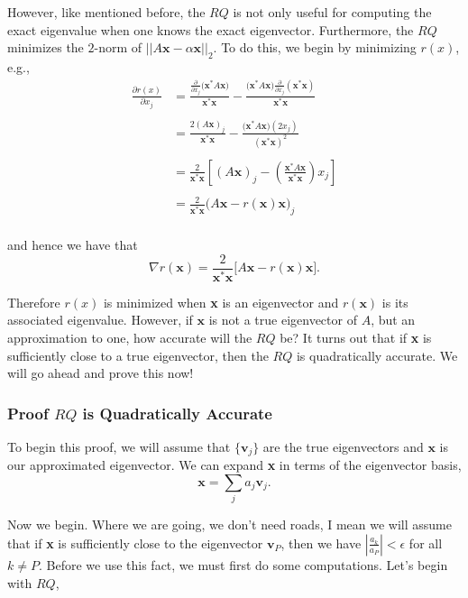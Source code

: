 \documentclass[paper=a4, fontsize=11pt]{scrartcl} %
\numberwithin{equation}{section} %
\numberwithin{figure}{section} %
\numberwithin{table}{section} %
\begin{document}
However, like mentioned before, the $RQ$ is not only useful for computing the exact eigenvalue when one knows the exact eigenvector. Furthermore, the $RQ$ minimizes the $2$-norm of $||A\textbf{x}-\alpha\textbf{x}||_2.$ To do this, we begin by minimizing $r(x)$, e.g.,
\begin{align*}
\frac{ \partial r(x) }{ \partial x_j } &= \frac{  \frac{ \partial}{ \partial x_j} \big( \textbf{x}^* A\textbf{x} \big) }{  \textbf{x}^*\textbf{x}  } - \frac{ \big(\textbf{x}^*A\textbf{x}  \big) \frac{\partial}{\partial x_j }  (\textbf{x}^*\textbf{x} )    }{  \textbf{x}^* \textbf{x} } \\ \\
%
	&= \frac{ 2(A\textbf{x})_j }{   \textbf{x}^*\textbf{x} } - \frac{  \big(\textbf{x}^*A\textbf{x}\big)(2x_j)    }{ ( \textbf{x}^*\textbf{x})^2      } \\ \\ 
	&= \frac{2}{ \textbf{x}^*\textbf{x} } \left[  (A\textbf{x})_j - \left( \frac{  \textbf{x}^*A\textbf{x} }{ \textbf{x}^*\textbf{x} }      \right) x_j       \right] \\ \\
	&= \frac{2}{ \textbf{x}^*\textbf{x} } \bigg(  A\textbf{x} - r(\textbf{x}) \textbf{x}   \bigg)_j \\
\end{align*}

and hence we have that $$\nabla r(\textbf{x}) = \frac{2}{ \textbf{x}^*\textbf{x} } \big[  A\textbf{x} - r(\textbf{x}) \textbf{x} \big].$$

Therefore $r(x)$ is minimized when \textbf{x} is an eigenvector and $r(\textbf{x})$ is its associated eigenvalue. However, if $\textbf{x}$ is not a true eigenvector of $A$, but an approximation to one, how accurate will the $RQ$ be? It turns out that if \textbf{x} is sufficiently close to a true eigenvector, then the $RQ$ is quadratically accurate. We will go ahead and prove this now!

%
%
\subsubsection{Proof $RQ$ is Quadratically Accurate}

To begin this proof, we will assume that $\{ \textbf{v}_j \}$ are the true eigenvectors and $\textbf{x}$ is our approximated eigenvector. We can expand \textbf{x} in terms of the eigenvector basis, $$\textbf{x} = \sum_j a_j \textbf{v}_j.$$

Now we begin. Where we are going, we don't need roads, I mean we will assume that if \textbf{x} is sufficiently close to the eigenvector $\textbf{v}_P$, then we have $\left| \frac{a_k}{a_P}  \right| < \epsilon$ for all $k\neq P$. Before we use this fact, we must first do some computations. Let's begin with $RQ$,
\end{document}
